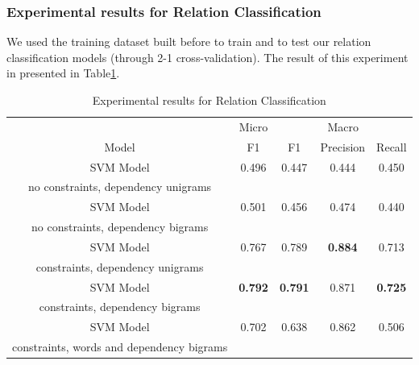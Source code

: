 \documentclass[twocolumn]{article}
\begin{document}
\subsubsection{Experimental results for Relation Classification}

We used the training dataset built before to train and to test our relation classification models (through 2-1 cross-validation). The result of this experiment in presented in Table\ref{resultsRelationClassification}.

\begin{table}[t]
\center
\begin{tabular}{c||c|c|c|c}
	 & Micro & \multicolumn{3}{c}{Macro} \\
	Model & F1 & F1 & Precision & Recall \\
	\hline
	\hline
	SVM Model & 0.496 & 0.447 & 0.444 & 0.450\\
	no constraints, dependency unigrams & & & & \\ \hline
	SVM Model & 0.501 & 0.456 & 0.474 & 0.440\\
	no constraints, dependency bigrams & & & & \\ \hline
	SVM Model & 0.767 & 0.789 & \textbf{0.884} & 0.713\\
	constraints, dependency unigrams & & & & \\ \hline
	SVM Model & \textbf{0.792} & \textbf{0.791} & 0.871 & \textbf{0.725}\\
	constraints, dependency bigrams & & & & \\ \hline
	SVM Model & 0.702 & 0.638 & 0.862 & 0.506\\
	constraints, words and dependency bigrams & & & &
\end{tabular}
\caption{\label{resultsRelationClassification} Experimental results for Relation Classification}
\end{table}
\end{document}
